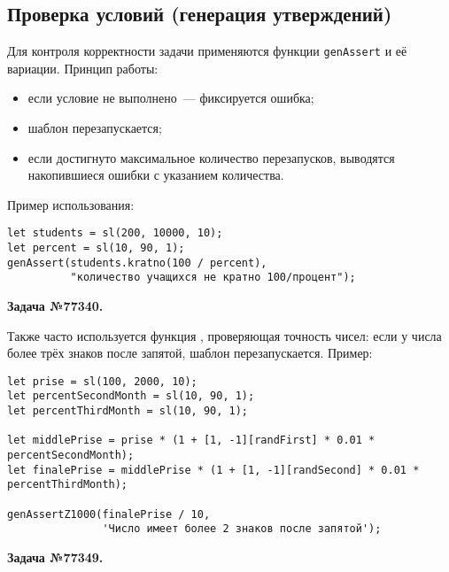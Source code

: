 \subsection{Проверка условий (генерация утверждений)}
Для контроля корректности задачи применяются функции \texttt{genAssert} и её вариации. Принцип работы:  
\begin{itemize}
    \item если условие не выполнено~--- фиксируется ошибка;
    \item шаблон перезапускается;
    \item если достигнуто максимальное количество перезапусков, выводятся накопившиеся ошибки с указанием количества.
\end{itemize}

Пример использования:
\begin{lstlisting}
let students = sl(200, 10000, 10);
let percent = sl(10, 90, 1); 
genAssert(students.kratno(100 / percent),
          "количество учащихся не кратно 100/процент");
\end{lstlisting}
\textbf{Задача №77340.}

Также часто используется функция , проверяющая точность чисел: если у числа более трёх знаков после запятой, шаблон перезапускается.  
Пример:
\begin{lstlisting}
let prise = sl(100, 2000, 10);
let percentSecondMonth = sl(10, 90, 1);
let percentThirdMonth = sl(10, 90, 1);

let middlePrise = prise * (1 + [1, -1][randFirst] * 0.01 * percentSecondMonth);
let finalePrise = middlePrise * (1 + [1, -1][randSecond] * 0.01 * percentThirdMonth);

genAssertZ1000(finalePrise / 10,
               'Число имеет более 2 знаков после запятой');
\end{lstlisting}
\textbf{Задача №77349.}